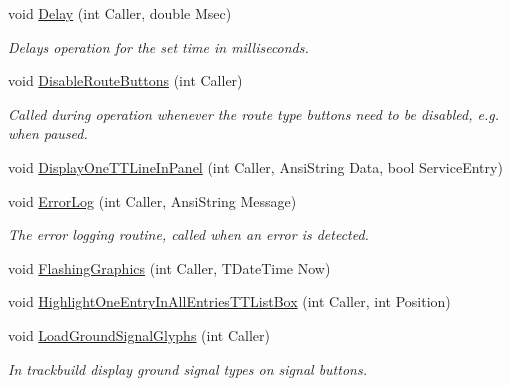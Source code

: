 \begin{DoxyCompactItemize}
\mbox{\label{class_t_interface_a7fa894f52a3cb9746e81166ec1a81bf3}} 
void \mbox{\hyperlink{class_t_interface_a7fa894f52a3cb9746e81166ec1a81bf3}{Delay}} (int Caller, double Msec)
\begin{DoxyCompactList}\small\item\em Delays operation for the set time in milliseconds. \end{DoxyCompactList}\item 
\mbox{\label{class_t_interface_ac0c9be911e93134ddda04ba498a8bd9c}} 
void \mbox{\hyperlink{class_t_interface_ac0c9be911e93134ddda04ba498a8bd9c}{Disable\+Route\+Buttons}} (int Caller)
\begin{DoxyCompactList}\small\item\em Called during operation whenever the route type buttons need to be disabled, e.\+g. when paused. \end{DoxyCompactList}\item 
void \mbox{\hyperlink{class_t_interface_a1181c865da8cea56e6f0af6b31a88db0}{Display\+One\+T\+T\+Line\+In\+Panel}} (int Caller, Ansi\+String Data, bool Service\+Entry)
\item 
\mbox{\label{class_t_interface_a4f3a25665e2266441217849f947a1adf}} 
void \mbox{\hyperlink{class_t_interface_a4f3a25665e2266441217849f947a1adf}{Error\+Log}} (int Caller, Ansi\+String Message)
\begin{DoxyCompactList}\small\item\em The error logging routine, called when an error is detected. \end{DoxyCompactList}\item 
void \mbox{\hyperlink{class_t_interface_a7e6535742855a19cb3e35b1711a7ab59}{Flashing\+Graphics}} (int Caller, T\+Date\+Time Now)
\item 
void \mbox{\hyperlink{class_t_interface_a273468a729b5b2ba5dd599c5ae1a1c19}{Highlight\+One\+Entry\+In\+All\+Entries\+T\+T\+List\+Box}} (int Caller, int Position)
\item 
\mbox{\label{class_t_interface_a3f17b5281842894e9cd477b4351a6c9f}} 
void \mbox{\hyperlink{class_t_interface_a3f17b5281842894e9cd477b4351a6c9f}{Load\+Ground\+Signal\+Glyphs}} (int Caller)
\begin{DoxyCompactList}\small\item\em In trackbuild display ground signal types on signal buttons. \end{DoxyCompactList}\item 

\end{DoxyCompactItemize}
